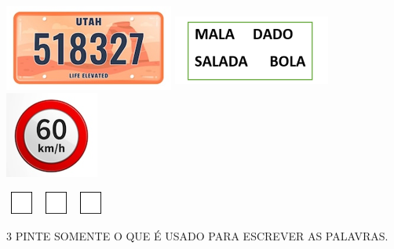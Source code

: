 \includegraphics[width=2.18819in,height=1.11111in]{media/image2.png}
\includegraphics[width=2.03681in,height=1.04861in]{media/image3.png}
\includegraphics[width=1.20556in,height=1.11111in]{media/image4.png}

\hspace{2cm}\includegraphics[width=0.40972in,height=0.30069in]{media/image5.png}
\hspace{4.5cm}\includegraphics[width=0.40972in,height=0.30069in]{media/image5.png}
\hspace{3cm}\includegraphics[width=0.40972in,height=0.30069in]{media/image5.png}


\num{3} PINTE SOMENTE O QUE É USADO PARA ESCREVER AS PALAVRAS.

